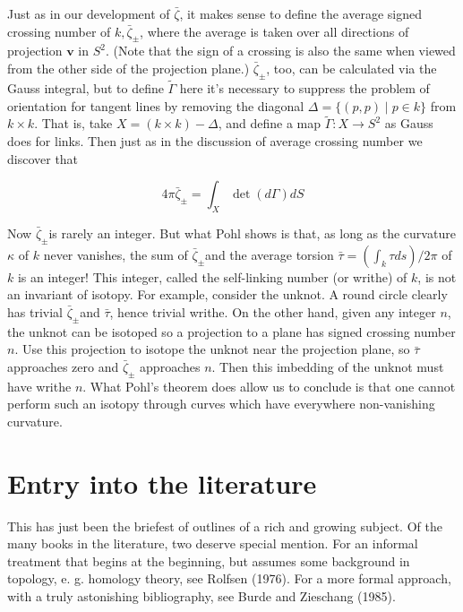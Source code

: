 \documentclass[10pt, letterpaper]{article}
\begin{document}
Just as in our development of $\bar{\zeta}$, it makes sense to define the average signed crossing number of $k, \bar{\zeta}_{ \pm}$, where the average is taken over all directions of projection $\mathbf{v}$ in $S^{2}$. (Note that the sign of a crossing is also the same when viewed from the other side of the projection plane.) $\bar{\zeta}_{ \pm}$, too, can be calculated via the Gauss integral, but to define $\tilde{\Gamma}$ here it's necessary to suppress the problem of orientation for tangent lines by removing the diagonal $\Delta=\{(p, p) \mid p \in k\}$ from $k \times k$. That is, take $X=(k \times k)-\Delta$, and define a map $\tilde{\Gamma}: X \rightarrow S^{2}$ as Gauss does for links. Then just as in the discussion of average crossing number we discover that

$$
4 \pi \bar{\zeta}_{ \pm}=\int_{X} \operatorname{det}(d \Gamma) d S
$$

Now $\bar{\zeta}_{ \pm}$is rarely an integer. But what Pohl shows is that, as long as the curvature $\kappa$ of $k$ never vanishes, the sum of $\bar{\zeta}_{ \pm}$and the average torsion $\bar{\tau}=\left(\int_{k} \tau d s\right) / 2 \pi$ of $k$ is an integer! This integer, called the self-linking number (or writhe) of $k$, is not an invariant of isotopy. For example, consider the unknot. A round circle clearly has trivial $\bar{\zeta}_{ \pm}$and $\bar{\tau}$, hence trivial writhe. On the other hand, given any integer $n$, the unknot can be isotoped so a projection to a plane has signed crossing number $n$. Use this projection to isotope the unknot near the projection plane, so $\bar{\tau}$ approaches zero and $\bar{\zeta}_{ \pm}$ approaches $n$. Then this imbedding of the unknot must have writhe $n$. What Pohl's theorem does allow us to conclude is that one cannot perform such an isotopy through curves which have everywhere non-vanishing curvature.

\section*{Entry into the literature}
This has just been the briefest of outlines of a rich and growing subject. Of the many books in the literature, two deserve special mention. For an informal treatment that begins at the beginning, but assumes some background in topology, e. g. homology theory, see Rolfsen (1976). For a more formal approach, with a truly astonishing bibliography, see Burde and Zieschang (1985).
\end{document}
